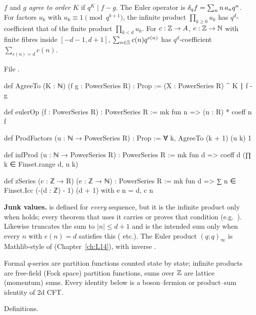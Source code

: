 \begin{definition}\label{l25:def:toolkit}
$f$ and $g$ \emph{agree to order $K$} if $q^K\mid f-g$. The Euler operator is $\delta_q f=\sum_nn\,a_nq^n$. For factors
$u_k$ with $u_k\equiv1\pmod{q^{k+1}}$, the infinite product $\prod_{k\ge0}u_k$ has $q^d$-coefficient that of the
finite product $\prod_{k<d}u_k$. For $c:{\mathbb{Z}}\to A$, $e:{\mathbb{Z}}\to{\mathbb{N}}$ with finite fibres inside $[-d-1,d+1]$,
$\sum_{n\in{\mathbb{Z}}}c(n)q^{e(n)}$ has $q^d$-coefficient $\sum_{e(n)=d}c(n)$.
\end{definition}
\noindent File .
\begin{leancode}
def AgreeTo (K : ℕ) (f g : PowerSeries R) : Prop := (X : PowerSeries R) ^ K ∣ f - g

def eulerOp (f : PowerSeries R) : PowerSeries R := mk fun n => (n : R) * coeff n f

def ProdFactors (u : ℕ → PowerSeries R) : Prop := ∀ k, AgreeTo (k + 1) (u k) 1

def infProd (u : ℕ → PowerSeries R) : PowerSeries R :=
  mk fun d => coeff d (∏ k ∈ Finset.range d, u k)

def zSeries (c : ℤ → R) (e : ℤ → ℕ) : PowerSeries R :=
  mk fun d => ∑ n ∈ Finset.Icc (-(d : ℤ) - 1) (d + 1) with e n = d, c n
\end{leancode}
\begin{dictionary}
\textbf{Junk values.}  is defined for \emph{every} sequence, but it is the infinite product only
when  holds; every theorem that uses it carries or proves that condition
(e.g.\ ). Likewise  truncates the sum to $|n|\le d+1$ and is
the intended sum only when every $n$ with $e(n)=d$ satisfies this ( etc.). The Euler
product $(q;q)_\infty$ is Mathlib-style  of  (Chapter~\ref{ch:L14}), with
inverse .
\end{dictionary}
\begin{physics}
Formal $q$-series are partition functions counted state by state; infinite products are free-field (Fock space)
partition functions, sums over ${\mathbb{Z}}$ are lattice (momentum) sums. Every identity below is a boson--fermion or
product--sum identity of 2d CFT.
\end{physics}
\begin{status}
Definitions.
\end{status}

